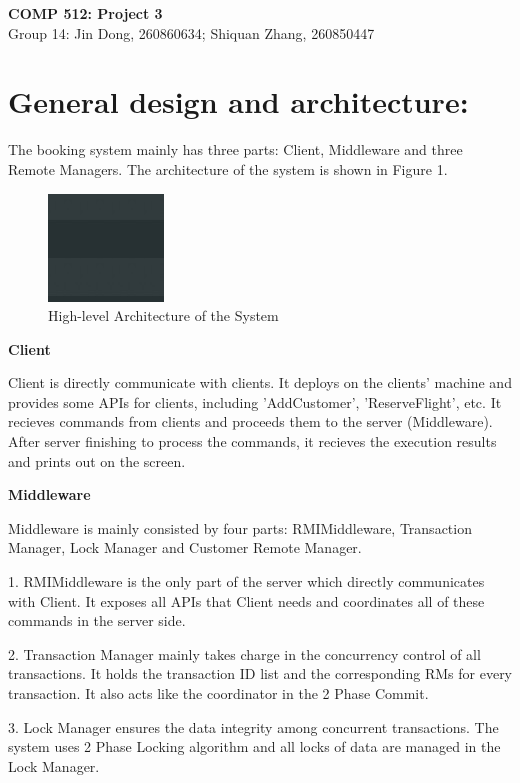 \documentclass[a4paper, 12pt]{article}
\title{}
\author{Jin Dong}
\newcommand{\newAssignment}[2]{
	\begin{center}
  		\textbf{{\huge #1}}\vspace{10pt} \\
  		{\large #2}\vspace{15pt}
	\end{center}
}
\newcommand{\newQuestion}[1]{\section{#1}}
\newcommand{\newPart}[1]{\textbf{\large #1}}
\begin{document}
\newAssignment{COMP 512: Project 3 }{Group 14: Jin Dong, 260860634; Shiquan Zhang, 260850447}

\newQuestion{General design and architecture:} 

The booking system mainly has three parts: Client, Middleware and three Remote Managers. The architecture of the system is shown in Figure 1.

\begin{figure}[H]
    \centering
    \includegraphics[width=0.5\linewidth]{Figure1.jpg}
    \caption{High-level Architecture of the System}
    \label{fig:Figure_1}
\end{figure}

\newPart{Client}

Client is directly communicate with clients. It deploys on the clients' machine and provides some APIs for clients, including 'AddCustomer', 'ReserveFlight', etc. It recieves commands from clients and proceeds them to the server (Middleware). 
After server finishing to process the commands, it recieves the execution results and prints out on the screen.

\newPart{Middleware}

Middleware is mainly consisted by four parts: RMIMiddleware, Transaction Manager, Lock Manager and Customer Remote Manager. 

1. RMIMiddleware is the only part of the server which directly communicates with Client. It exposes all APIs that Client needs and coordinates all of these commands in the server side. 

2. Transaction Manager mainly takes charge in the concurrency control of all transactions. It holds the transaction ID list and the corresponding RMs for every transaction. It also acts like the coordinator in the 2 Phase Commit.

3. Lock Manager ensures the data integrity among concurrent transactions. The system uses 2 Phase Locking algorithm and all locks of data are managed in the Lock Manager.
\end{document}
